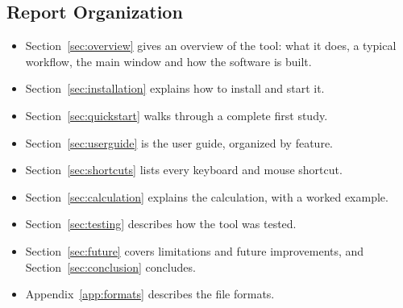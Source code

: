 \subsection{Report Organization}

\begin{itemize}
  \item Section~\ref{sec:overview} gives an overview of the tool: what it does, a
        typical workflow, the main window and how the software is built.
  \item Section~\ref{sec:installation} explains how to install and start it.
  \item Section~\ref{sec:quickstart} walks through a complete first study.
  \item Section~\ref{sec:userguide} is the user guide, organized by feature.
  \item Section~\ref{sec:shortcuts} lists every keyboard and mouse shortcut.
  \item Section~\ref{sec:calculation} explains the calculation, with a worked example.
  \item Section~\ref{sec:testing} describes how the tool was tested.
  \item Section~\ref{sec:future} covers limitations and future improvements, and
        Section~\ref{sec:conclusion} concludes.
  \item Appendix~\ref{app:formats} describes the file formats.
\end{itemize}
